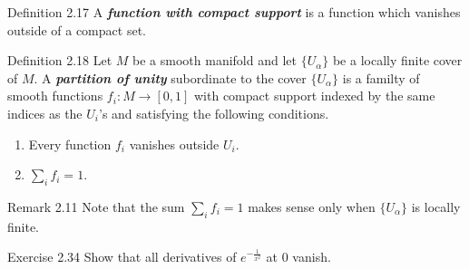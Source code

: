 \begin{thing3}{Definition 2.17}\label{def:2.17}\leavevmode
A \textit{\textbf{function with compact support}} is a function which vanishes outside of a compact set.
\end{thing3}

\begin{thing3}{Definition 2.18}\label{def:2.18}\leavevmode
	Let \(M\) be a smooth manifold and let \(\{U_\alpha\}\) be a locally finite cover of \(M\). A \textit{\textbf{partition of unity}} subordinate to the cover \(\{U_\alpha\}\) is a familty of smooth functions \(f_i:M\to [0,1]\) with compact support indexed by the same indices as the \(U_i\)'s and satisfying the following conditions.
	\begin{enumerate}[label=(\alph*)]
	\item Every function \(f_i\) vanishes outside \(U_i\).
	\item \(\sum_i f_i=1\).
	\end{enumerate}
\end{thing3}

\begin{thing5}{Remark 2.11}\label{rk:2.11}\leavevmode
Note that the sum \(\sum_if_i=1\) makes sense only when \(\{U_\alpha\}\) is locally finite.
\end{thing5}

\begin{thing4}{Exercise 2.34}\label{exer:2.34}\leavevmode
Show that all derivatives of \(e^{-\frac{1}{x^2}}\) at 0 vanish.
\end{thing4}

